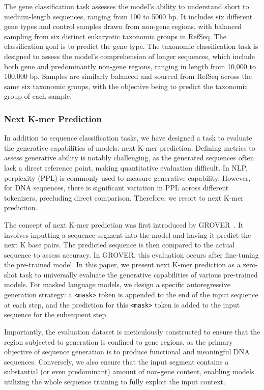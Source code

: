 The gene classification task assesses the model's ability to understand short to medium-length sequences, ranging from 100 to 5000 bp. It includes six different gene types and control samples drawn from non-gene regions, with balanced sampling from six distinct eukaryotic taxonomic groups in RefSeq. The classification goal is to predict the gene type. The taxonomic classification task is designed to assess the model's comprehension of longer sequences, which include both gene and predominantly non-gene regions, ranging in length from 10,000 to 100,000 bp. Samples are similarly balanced and sourced from RefSeq across the same six taxonomic groups, with the objective being to predict the taxonomic group of each sample.

\subsubsection{Next K-mer Prediction}
In addition to sequence classification tasks, we have designed a task to evaluate the generative capabilities of models: next K-mer prediction. Defining metrics to assess generative ability is notably challenging, as the generated sequences often lack a direct reference point, making quantitative evaluation difficult. In NLP, perplexity (PPL) is commonly used to measure generative capability. However, for DNA sequences, there is significant variation in PPL across different tokenizers, precluding direct comparison. Therefore, we resort to next K-mer prediction.

The concept of next K-mer prediction was first introduced by GROVER~\cite{GROVER}. It involves inputting a sequence segment into the model and having it predict the next K base pairs. The predicted sequence is then compared to the actual sequence to assess accuracy. In GROVER, this evaluation occurs after fine-tuning the pre-trained model. In this paper, we present next K-mer prediction as a zero-shot task to universally evaluate the generative capabilities of various pre-trained models. For masked language models, we design a specific autoregressive generation strategy: a \texttt{<mask>} token is appended to the end of the input sequence at each step, and the prediction for this \texttt{<mask>} token is added to the input sequence for the subsequent step.

Importantly, the evaluation dataset is meticulously constructed to ensure that the region subjected to generation is confined to gene regions, as the primary objective of sequence generation is to produce functional and meaningful DNA sequences. Conversely, we also ensure that the input segment contains a substantial (or even predominant) amount of non-gene content, enabling models utilizing the whole sequence training to fully exploit the input context.

